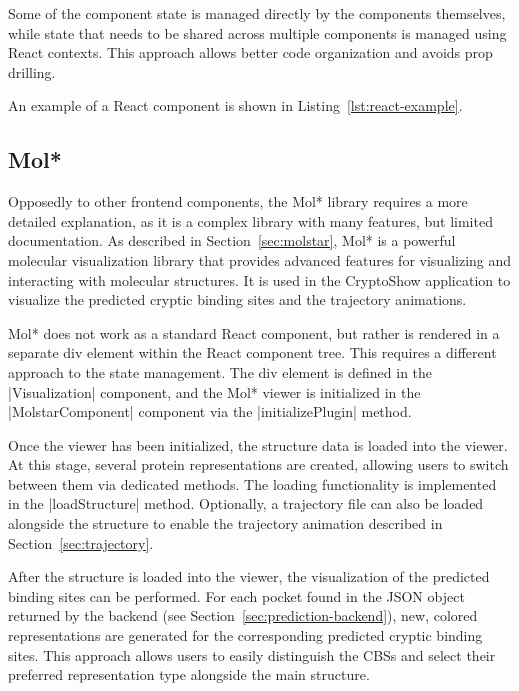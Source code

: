 Some of the component state is managed directly by the components themselves, while state that needs to be shared across multiple components is managed using React contexts. This approach allows better code organization and avoids prop drilling.

An example of a React component is shown in Listing~\ref{lst:react-example}.



\subsection{Mol*}
\label{sec:molstar-frontend}

Opposedly to other frontend components, the Mol* library requires a more detailed explanation, as it is a complex library with many features, but limited documentation. As described in Section~\ref{sec:molstar}, Mol* is a powerful molecular visualization library that provides advanced features for visualizing and interacting with molecular structures. It is used in the CryptoShow application to visualize the predicted cryptic binding sites and the trajectory animations.

Mol* does not work as a standard React component, but rather is rendered in a separate div element within the React component tree. This requires a different approach to the state management. The div element is defined in the \inline|Visualization| component, and the Mol* viewer is initialized in the \inline|MolstarComponent| component via the \inline|initializePlugin| method.

Once the viewer has been initialized, the structure data is loaded into the viewer. At this stage, several protein representations are created, allowing users to switch between them via dedicated methods. The loading functionality is implemented in the \inline|loadStructure| method. Optionally, a trajectory file can also be loaded alongside the structure to enable the trajectory animation described in Section~\ref{sec:trajectory}.

After the structure is loaded into the viewer, the visualization of the predicted binding sites can be performed. For each pocket found in the JSON object returned by the backend (see Section~\ref{sec:prediction-backend}), new, colored representations are generated for the corresponding predicted cryptic binding sites. This approach allows users to easily distinguish the CBSs and select their preferred representation type alongside the main structure.

